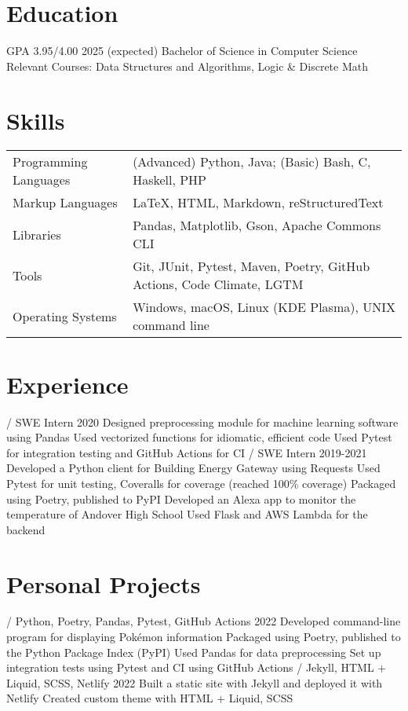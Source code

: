 \begin{outline}

\renewcommand{\outlinei}{description}

\0 \section{Education}
     GPA 3.95/4.00 \hfill 2025 (expected)
        \2 Bachelor of Science in Computer Science
        \2 Relevant Courses: Data Structures and Algorithms, Logic \& Discrete Math

\0 \section{Skills}
\0 
    \noindent\begin{tabular}{@{}ll}
        Programming Languages & (Advanced) Python, Java; (Basic) Bash, C, Haskell, PHP \\
        Markup Languages & \LaTeX, HTML, Markdown, reStructuredText \\
        Libraries & Pandas, Matplotlib, Gson, Apache Commons CLI \\
        Tools & Git, JUnit, Pytest, Maven, Poetry, GitHub Actions, Code Climate, LGTM \\
        Operating Systems & Windows, macOS, Linux (KDE Plasma), UNIX command line \\
    \end{tabular}

\0 \section{Experience}
     / SWE Intern \hfill 2020
        \2 Designed preprocessing module for machine learning software using Pandas
        \2 Used vectorized functions for idiomatic, efficient code
        \2 Used Pytest for integration testing and GitHub Actions for CI
     / SWE Intern \hfill 2019-2021
        \2 Developed a Python client for Building Energy Gateway using Requests
        \2 Used Pytest for unit testing, Coveralls for coverage (reached 100\% coverage)
        \2 Packaged using Poetry, published to PyPI
        \2 Developed an Alexa app to monitor the temperature of Andover High School
        \2 Used Flask and AWS Lambda for the backend

\0 \section{Personal Projects}
    \1[Pokésummary] / Python, Poetry, Pandas, Pytest, GitHub Actions \hfill 2022
        \2 Developed command-line program for displaying Pokémon information
        \2 Packaged using Poetry, published to the Python Package Index (PyPI)
        \2 Used Pandas for data preprocessing
        \2 Set up integration tests using Pytest and CI using GitHub Actions
     / Jekyll, HTML + Liquid, SCSS, Netlify \hfill 2022
        \2 Built a static site with Jekyll and deployed it with Netlify
        \2 Created custom theme with HTML + Liquid, SCSS


\end{outline}

